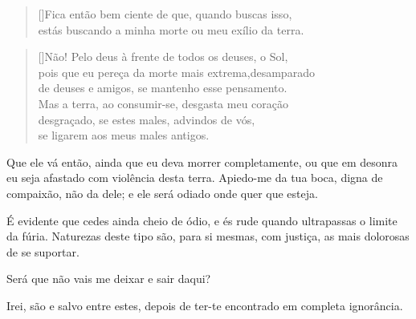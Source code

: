 
\settowidth{\versewidth}{brilhante? Tenso, agito-me com medo em meu trêmulo}
\begin{verse}[\versewidth]Fica então bem ciente de que, quando buscas isso,\\
estás buscando a minha morte ou meu exílio da terra.
\end{verse}



\settowidth{\versewidth}{brilhante? Tenso, agito-me com medo em meu trê}
\begin{verse}[\versewidth]Não! Pelo deus à frente de todos os deuses, o Sol,\\
pois que eu pereça da morte mais extrema,\qb desamparado\\
de deuses e amigos, se mantenho esse pensamento.\\
Mas a terra, ao consumir-se, desgasta meu coração\\
desgraçado, se estes males, advindos de vós,\\
se ligarem aos meus males antigos.
\end{verse}


Que ele vá então, ainda que eu deva morrer completamente, ou que em
desonra eu seja afastado com violência desta terra. Apiedo-me da
tua boca, digna de compaixão, não da dele; e ele será odiado onde quer
que esteja.

   É evidente que cedes ainda cheio de ódio, e és rude quando ultrapassas o
limite da fúria. Naturezas deste tipo são, para si mesmas, com justiça,
as mais dolorosas de se suportar.

   Será que não vais me deixar e sair daqui?

   Irei, são e salvo entre estes, depois de ter-te encontrado em completa
ignorância.





